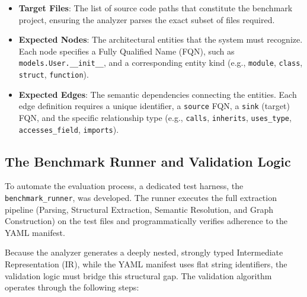 \begin{itemize}
  \item \textbf{Target Files}: The list of source code paths that
    constitute the benchmark project, ensuring the analyzer parses
    the exact subset of files required.
  \item \textbf{Expected Nodes}: The architectural entities that the
    system must recognize. Each node specifies a Fully Qualified Name
    (FQN), such as \texttt{models.User.\_\_init\_\_}, and a
    corresponding entity kind (e.g., \texttt{module}, \texttt{class},
    \texttt{struct}, \texttt{function}).
  \item \textbf{Expected Edges}: The semantic dependencies connecting
    the entities. Each edge definition requires a unique identifier,
    a \texttt{source} FQN, a \texttt{sink} (target) FQN, and the
    specific relationship type (e.g., \texttt{calls},
      \texttt{inherits}, \texttt{uses\_type}, \texttt{accesses\_field},
    \texttt{imports}).
\end{itemize}

\subsection{The Benchmark Runner and Validation Logic}
To automate the evaluation process, a dedicated test harness, the
\texttt{benchmark\_runner}, was developed. The runner executes the
full extraction pipeline (Parsing, Structural Extraction, Semantic
Resolution, and Graph Construction) on the test files and
programmatically verifies adherence to the YAML manifest.

Because the analyzer generates a deeply nested, strongly typed
Intermediate Representation (IR), while the YAML manifest uses flat
string identifiers, the validation logic must bridge this structural
gap. The validation algorithm operates through the following steps:

